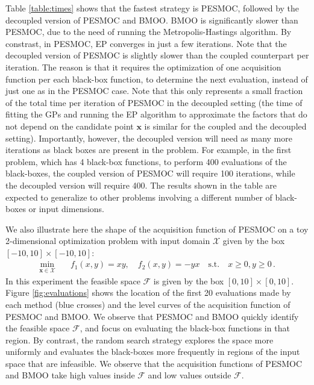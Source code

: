 \documentclass[review,preprint,12pt]{elsarticle}
\begin{document}
Table \ref{table:times} shows that the fastest strategy is PESMOC, followed by the decoupled version of PESMOC and BMOO. BMOO is significantly slower 
than PESMOC, due to the need of running the Metropolis-Hastings algorithm.  By constrast, in PESMOC, EP converges in just a few iterations. Note that 
the decoupled version of PESMOC is slightly slower than the coupled counterpart per iteration.  The reason is that it requires the optimization of one acquisition 
function per each black-box function, to determine the next evaluation, instead of just one as in the PESMOC case. Note that this only represents a 
small fraction of the total time per iteration of PESMOC in the decoupled setting (the time of fitting the GPs and running the EP algorithm to approximate the 
factors that do not depend on the candidate point $\mathbf{x}$ is similar for the coupled and the decoupled setting). Importantly, however, 
the decoupled version will need as many more iterations as black boxes are present in the problem. For example, in the first problem, which has 4 black-box functions, 
to perform 400 evaluations of the black-boxes, the coupled version of PESMOC will require 100 iterations, while the decoupled version will require 400. The results 
shown in the table are expected to generalize to other problems involving a different number of black-boxes or input dimensions.

We also illustrate here the shape of the acquisition function of PESMOC on a toy 2-dimensional optimization 
problem with input domain $\mathcal{X}$ given by the box $[-10,10]\times[-10,10]$:
\begin{align}
\underset{\mathbf{x} \in \mathcal{X}}{\text{min}} & \quad f_1(x,y) = xy, 
\quad f_2(x,y) = -yx \nonumber \quad \text{s.t.} \quad x \geq 0, y \geq 0\,.
\end{align}
In this experiment the feasible space $\mathcal{F}$ is given by the box $[0,10]\times[0,10]$. 
Figure \ref{fig:evaluations} shows the location of the first 20 evaluations made
by each method (blue crosses) and the level curves of the acquisition function of PESMOC and BMOO. 
We observe that PESMOC and BMOO quickly identify the feasible space $\mathcal{F}$, and focus on 
evaluating the black-box functions in that region. By contrast, the random search strategy explores the space 
more uniformly and evaluates the black-boxes more frequently in regions of the input space that are infeasible. 
We observe that the acquisition functions of PESMOC and BMOO take high values inside 
$\mathcal{F}$ and low values outside $\mathcal{F}$.
\end{document}
